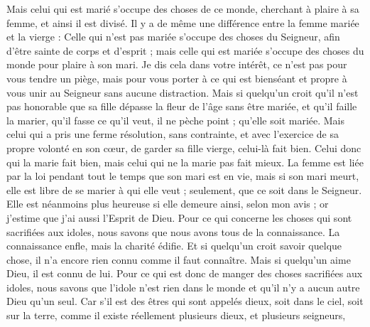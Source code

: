 \begin{multicols}{2}
Mais celui qui est marié s'occupe des choses de ce monde, cherchant à plaire à sa femme, et ainsi il est divisé.
Il y a de même une différence entre la femme mariée et la vierge : Celle qui n'est pas mariée s'occupe des choses du Seigneur, afin d'être sainte de corps et d'esprit ; mais celle qui est mariée s'occupe des choses du monde pour plaire à son mari.
Je dis cela dans votre intérêt, ce n'est pas pour vous tendre un piège, mais pour vous porter à ce qui est bienséant et propre à vous unir au Seigneur sans aucune distraction.
Mais si quelqu'un croit qu'il n'est pas honorable que sa fille dépasse la fleur de l'âge sans être mariée, et qu'il faille la marier, qu'il fasse ce qu'il veut, il ne pèche point ; qu'elle soit mariée.
Mais celui qui a pris une ferme résolution, sans contrainte, et avec l'exercice de sa propre volonté en son cœur, de garder sa fille vierge, celui-là fait bien.
Celui donc qui la marie fait bien, mais celui qui ne la marie pas fait mieux.
La femme est liée par la loi pendant tout le temps que son mari est en vie, mais si son mari meurt, elle est libre de se marier à qui elle veut ; seulement, que ce soit dans le Seigneur.
Elle est néanmoins plus heureuse si elle demeure ainsi, selon mon avis ; or j'estime que j'ai aussi l'Esprit de Dieu.
\VerseOne{}Pour ce qui concerne les choses qui sont sacrifiées aux idoles, nous savons que nous avons tous de la connaissance. La connaissance enfle, mais la charité édifie.
Et si quelqu'un croit savoir quelque chose, il n'a encore rien connu comme il faut connaître.
Mais si quelqu'un aime Dieu, il est connu de lui.
Pour ce qui est donc de manger des choses sacrifiées aux idoles, nous savons que l'idole n'est rien dans le monde et qu'il n'y a aucun autre Dieu qu'un seul.
Car s'il est des êtres qui sont appelés dieux, soit dans le ciel, soit sur la terre, comme il existe réellement plusieurs dieux, et plusieurs seigneurs,

\end{multicols}
